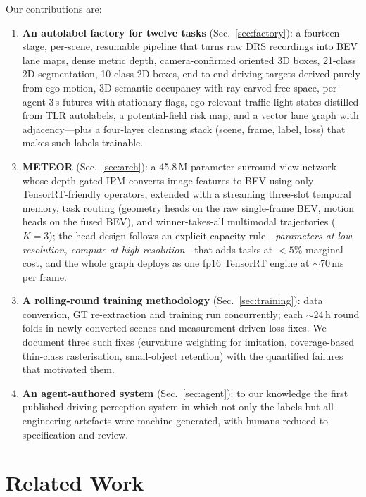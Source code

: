 \documentclass[10pt,twocolumn]{article}
\newcommand{\meteor}{METEOR}
\begin{document}
\noindent Our contributions are:
\begin{enumerate}\itemsep1pt
\item \textbf{An autolabel factory for twelve tasks} (Sec.~\ref{sec:factory}):
a fourteen-stage, per-scene, resumable pipeline that turns raw DRS recordings
into BEV lane maps, dense metric depth, camera-confirmed oriented 3D boxes,
21-class 2D segmentation, 10-class 2D boxes, end-to-end driving targets
derived purely from ego-motion, 3D semantic occupancy with ray-carved free
space, per-agent 3\,s futures with stationary flags, ego-relevant
traffic-light states distilled from TLR autolabels, a potential-field risk
map, and a vector lane graph with adjacency---plus a four-layer cleansing
stack (scene, frame, label, loss) that makes such labels trainable.
\item \textbf{\meteor{}} (Sec.~\ref{sec:arch}): a 45.8\,M-parameter
surround-view network whose depth-gated IPM converts image features to BEV
using only TensorRT-friendly operators, extended with a streaming three-slot
temporal memory, task routing (geometry heads on the raw single-frame BEV,
motion heads on the fused BEV), and winner-takes-all multimodal trajectories
($K{=}3$); the head design follows an explicit capacity rule---\emph{parameters
at low resolution, compute at high resolution}---that adds tasks at $<5\%$
marginal cost, and the whole graph deploys as one fp16 TensorRT engine at
$\sim$70\,ms per frame.
\item \textbf{A rolling-round training methodology}
(Sec.~\ref{sec:training}): data conversion, GT re-extraction and training run
concurrently; each $\sim$24\,h round folds in newly converted scenes and
measurement-driven loss fixes. We document three such fixes (curvature
weighting for imitation, coverage-based thin-class rasterisation, small-object
retention) with the quantified failures that motivated them.
\item \textbf{An agent-authored system} (Sec.~\ref{sec:agent}): to our
knowledge the first published driving-perception system in which not only the
labels but all engineering artefacts were machine-generated, with humans
reduced to specification and review.
\end{enumerate}

\section{Related Work}
\end{document}
